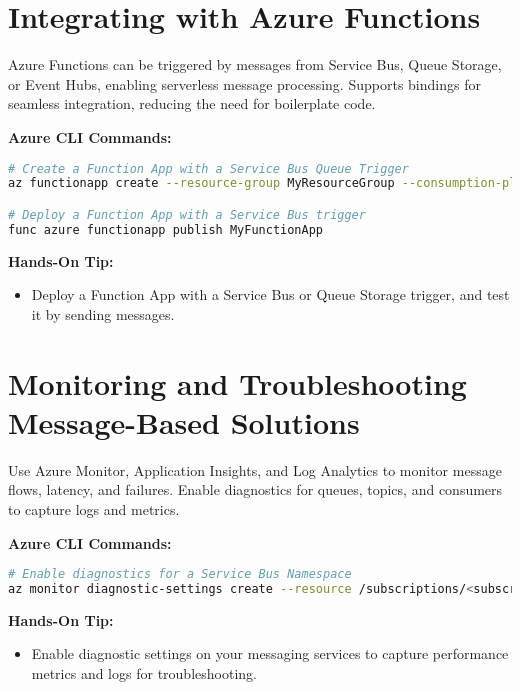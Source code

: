 \documentclass{article}
\begin{document}
\section{Integrating with Azure Functions}
Azure Functions can be triggered by messages from Service Bus, Queue Storage, or Event Hubs, enabling serverless message processing. Supports bindings for seamless integration, reducing the need for boilerplate code.

\textbf{Azure CLI Commands:}
\begin{lstlisting}[language=bash]
# Create a Function App with a Service Bus Queue Trigger
az functionapp create --resource-group MyResourceGroup --consumption-plan-location eastus --name MyFunctionApp --storage-account mystorageaccount --runtime dotnet

# Deploy a Function App with a Service Bus trigger
func azure functionapp publish MyFunctionApp
\end{lstlisting}

\textbf{Hands-On Tip:}
\begin{itemize}
    \item Deploy a Function App with a Service Bus or Queue Storage trigger, and test it by sending messages.
\end{itemize}

\section{Monitoring and Troubleshooting Message-Based Solutions}
Use Azure Monitor, Application Insights, and Log Analytics to monitor message flows, latency, and failures. Enable diagnostics for queues, topics, and consumers to capture logs and metrics.

\textbf{Azure CLI Commands:}
\begin{lstlisting}[language=bash]
# Enable diagnostics for a Service Bus Namespace
az monitor diagnostic-settings create --resource /subscriptions/<subscription-id>/resourceGroups/MyResourceGroup/providers/Microsoft.ServiceBus/namespaces/MyServiceBusNamespace --name MyDiagnostics --logs '[{"category": "OperationalLogs","enabled": true}]'
\end{lstlisting}

\textbf{Hands-On Tip:}
\begin{itemize}
    \item Enable diagnostic settings on your messaging services to capture performance metrics and logs for troubleshooting.
\end{itemize}
\end{document}
